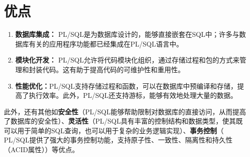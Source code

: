 \documentclass[11pt, a4paper, oneside, UTF8]{ctexbook}
\let\kaishu\relax %
\begin{document}
\section{优点}
\begin{enumerate}
  \item {\bfseries\kaishu 数据库集成：} PL/SQL是为数据库设计的，能够直接嵌套在SQL中；许多与数据库有关的应用程序功能都已经集成在PL/SQL语言中。
  \item {\bfseries\kaishu 模块化开发：} PL/SQL允许将代码模块化组织，通过存储过程和包的方式来管理和封装代码。这有助于提高代码的可维护性和重用性。
  \item {\bfseries\kaishu 性能优化：}PL/SQL支持存储过程和函数，可以在数据库中预编译和存储，提高了执行效率。此外，PL/SQL还支持游标，能够有效地处理大量的数据。
\end{enumerate}
此外，还有其他如\textbf{安全性}（PL/SQL能够帮助限制对数据库的直接访问，从而提高了数据库的安全性）、\textbf{灵活性}（PL/SQL具有丰富的控制结构和数据类型，使其既可以用于简单的SQL查询，也可以用于复杂的业务逻辑实现）、\textbf{事务控制}（ PL/SQL提供了强大的事务控制功能，支持原子性、一致性、隔离性和持久性（ACID属性））等优点。
\end{document}

